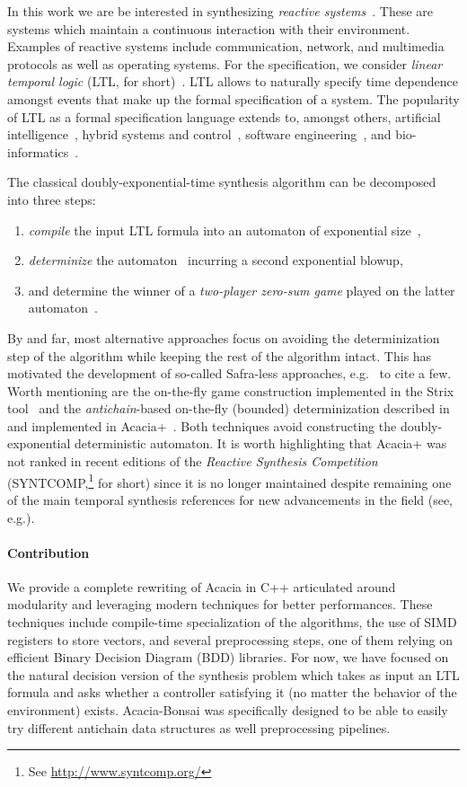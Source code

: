 \documentclass[sigconf,screen]{acmart}
\begin{document}
In this work we are be interested in synthesizing \emph{reactive
systems}~\cite{hp84}. These are systems which maintain a continuous
interaction with their environment.  Examples of reactive systems include
communication, network, and multimedia protocols as well as operating systems.
For the specification, we consider \emph{linear temporal logic} (LTL, for
short)~\cite{pnueli77}. LTL allows to naturally specify time dependence
amongst events that make up the formal specification of a system. The
popularity of LTL as a formal specification language extends to, amongst
others, artificial intelligence~\cite{gv16,cm19,gnpw20}, hybrid systems and
control~\cite{bvpyb16}, software engineering~\cite{lpb15}, and
bio-informatics~\cite{abbdfhinprs17}.

The
classical doubly-exponential-time synthesis algorithm can be decomposed
into three steps:
\begin{enumerate}
  \item \emph{compile} the input LTL formula into an automaton of exponential
    size~\cite{vw84},
  \item \emph{determinize} the automaton~\cite{safra88,piterman07} incurring a
    second exponential blowup,
  \item and determine the winner of a \emph{two-player zero-sum game} played
    on the latter automaton~\cite{pr89}.
\end{enumerate}
By and far, most alternative approaches focus on avoiding the determinization
step of the algorithm while keeping the rest of the algorithm intact.  This
has motivated the development of so-called Safra-less approaches,
e.g.~\cite{kpv06,eks16,ekrs17,tushy17} to cite a few.  Worth mentioning are
the on-the-fly game construction implemented in the Strix tool~\cite{msl18}
and the \emph{antichain}-based on-the-fly (bounded) determinization described
in~\cite{fjr09} and implemented in Acacia+~\cite{bbfjr12}. Both techniques
avoid constructing the doubly-exponential deterministic automaton.  It is
worth highlighting that Acacia+ was not ranked in recent editions of the
\emph{Reactive Synthesis Competition} (SYNTCOMP,\footnote{See
\url{http://www.syntcomp.org/}} for short) since it is no longer maintained
despite remaining one of the main temporal synthesis references for new
advancements in the field (see,
e.g.\cite{ffrt17,ztlpv17,apsec20,lms20,bltv20}).

\paragraph*{Contribution}
We provide a complete rewriting of Acacia in C++ articulated around modularity
and leveraging modern techniques for better performances. These techniques
include compile-time specialization of the algorithms, the use of SIMD
registers to store vectors, and several preprocessing steps, one of them
relying on efficient Binary Decision Diagram (BDD) libraries. For now, we have
focused on the natural decision version of the synthesis problem which takes as
input an LTL formula and asks whether a controller satisfying it (no matter
the behavior of the environment) exists. Acacia-Bonsai was specifically
designed to be able to easily try different antichain data structures as well
preprocessing pipelines.
\end{document}
